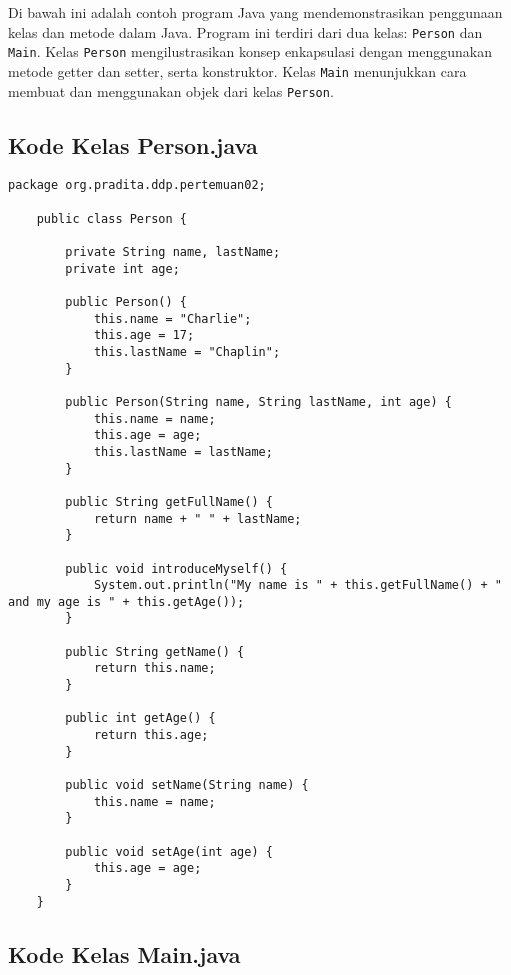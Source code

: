 Di bawah ini adalah contoh program Java yang mendemonstrasikan penggunaan kelas dan metode dalam Java. Program ini terdiri dari dua kelas: \texttt{Person} dan \texttt{Main}. Kelas \texttt{Person} mengilustrasikan konsep enkapsulasi dengan menggunakan metode getter dan setter, serta konstruktor. Kelas \texttt{Main} menunjukkan cara membuat dan menggunakan objek dari kelas \texttt{Person}.

\subsection{Kode Kelas Person.java}

\begin{lstlisting}[style=JavaStyle, caption={Kode Java: Person.java}]
	package org.pradita.ddp.pertemuan02;
	
	public class Person {
		
		private String name, lastName;
		private int age;
		
		public Person() {
			this.name = "Charlie";
			this.age = 17;
			this.lastName = "Chaplin";
		}
		
		public Person(String name, String lastName, int age) {
			this.name = name;
			this.age = age;
			this.lastName = lastName;
		}
		
		public String getFullName() {
			return name + " " + lastName;
		}
		
		public void introduceMyself() {
			System.out.println("My name is " + this.getFullName() + " and my age is " + this.getAge());
		}
		
		public String getName() {
			return this.name;
		}
		
		public int getAge() {
			return this.age;
		}
		
		public void setName(String name) {
			this.name = name;
		}
		
		public void setAge(int age) {
			this.age = age;
		}
	}
\end{lstlisting}

\subsection{Kode Kelas Main.java}

